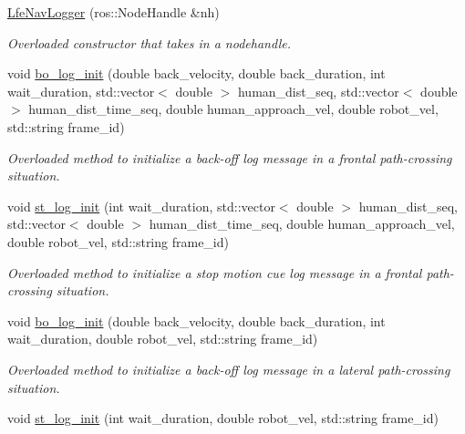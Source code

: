 \begin{DoxyCompactItemize}
\item 
\hyperlink{classlfe__navigation_1_1LfeNavLogger_a69c8bb8c1ffa217d452ebfce0fe01830}{Lfe\+Nav\+Logger} (ros\+::\+Node\+Handle \&nh)
\begin{DoxyCompactList}\small\item\em Overloaded constructor that takes in a nodehandle. \end{DoxyCompactList}\item 
void \hyperlink{classlfe__navigation_1_1LfeNavLogger_adca0a164d19d1d6fe5cfd9f8971c1789}{bo\+\_\+log\+\_\+init} (double back\+\_\+velocity, double back\+\_\+duration, int wait\+\_\+duration, std\+::vector$<$ double $>$ human\+\_\+dist\+\_\+seq, std\+::vector$<$ double $>$ human\+\_\+dist\+\_\+time\+\_\+seq, double human\+\_\+approach\+\_\+vel, double robot\+\_\+vel, std\+::string frame\+\_\+id)
\begin{DoxyCompactList}\small\item\em Overloaded method to initialize a back-\/off log message in a frontal path-\/crossing situation. \end{DoxyCompactList}\item 
void \hyperlink{classlfe__navigation_1_1LfeNavLogger_a39d9b5ec6adc8b0e9f2a4231e6bc42d7}{st\+\_\+log\+\_\+init} (int wait\+\_\+duration, std\+::vector$<$ double $>$ human\+\_\+dist\+\_\+seq, std\+::vector$<$ double $>$ human\+\_\+dist\+\_\+time\+\_\+seq, double human\+\_\+approach\+\_\+vel, double robot\+\_\+vel, std\+::string frame\+\_\+id)
\begin{DoxyCompactList}\small\item\em Overloaded method to initialize a stop motion cue log message in a frontal path-\/crossing situation. \end{DoxyCompactList}\item 
void \hyperlink{classlfe__navigation_1_1LfeNavLogger_a4354882dc26d1d1a2d54cae0c103819d}{bo\+\_\+log\+\_\+init} (double back\+\_\+velocity, double back\+\_\+duration, int wait\+\_\+duration, double robot\+\_\+vel, std\+::string frame\+\_\+id)
\begin{DoxyCompactList}\small\item\em Overloaded method to initialize a back-\/off log message in a lateral path-\/crossing situation. \end{DoxyCompactList}\item 
void \hyperlink{classlfe__navigation_1_1LfeNavLogger_aa33f5443f3ef9967303434786bdad551}{st\+\_\+log\+\_\+init} (int wait\+\_\+duration, double robot\+\_\+vel, std\+::string frame\+\_\+id)

\end{DoxyCompactItemize}
